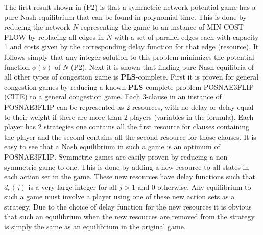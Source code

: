 \documentclass[]{article}
\begin{document}
The first result shown in (P2) is that a symmetric network potential game has a pure Nash equilibrium that can be found in polynomial time. This is done by reducing the network $N$ representing the game to an instance of \textsc{MIN-COST FLOW} by replacing all edges in $N$ with a set of parallel edges each with capacity 1 and costs given by the corresponding delay function for that edge (resource). It follows simply that any integer solution to this problem minimizes the potential function $\phi(s)$ of $N$ (P2). Next it is shown that finding pure Nash equilibria of all other types of congestion game is \textbf{PLS}-complete. First it is proven for general congestion games by reducing a known \textbf{PLS}-complete problem \textsc{POSNAE3FLIP} (CITE) to a general congestion game. Each 3-clause in an instance of \textsc{POSNAE3FLIP} can be represented as 2 resources, with no delay or delay equal to their weight if there are more than 2 players (variables in the formula). Each player has 2 strategies one contains all the first resource for clauses containing the player and the second contains all the second resource for those clauses. It is easy to see that a Nash equilibrium in such a game is an optimum of \textsc{POSNAE3FLIP}. Symmetric games are easily proven by reducing a non-symmetric game to one. This is done by adding a new resource to all states in each action set in the game. These new resources have delay functions such that $d_e(j)$ is a very large integer for all $j>1$ and $0$ otherwise. Any equilibrium to such a game must involve a player using one of these new action sets as a strategy. Due to the choice of delay function for the new resources it is obvious that such an equilibrium when the new resources are removed from the strategy is simply the same as an equilibrium in the original game.


\end{document}
